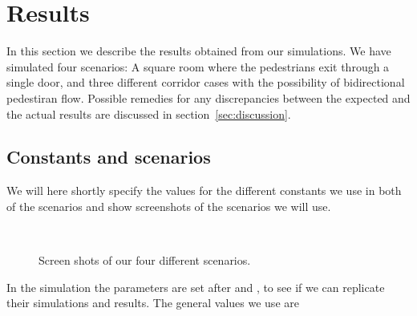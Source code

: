 \section{Results}
\label{sec:results}
In this section we describe the results obtained from our simulations. 
We have simulated four scenarios: A square room where the pedestrians 
exit through a single door, and three different corridor cases with  
the possibility of bidirectional pedestiran flow. Possible remedies 
for any discrepancies between the expected and the actual results are 
discussed in section~\ref{sec:discussion}.

\subsection{Constants and scenarios}
We will here shortly specify the values for the different constants 
we use in both of the scenarios and show screenshots of the scenarios 
we will use.

\begin{figure}[h]
\centering
{}
\subfloat[Bottleneck.]{\resizebox{7cm}{!}{}}\\
\subfloat[Corridor.]{\resizebox{7cm}{!}{}}
\caption{Screen shots of our four different scenarios.}
\label{fig:fourcases}
\end{figure}

In the simulation the parameters are set after \cite{ABconstant} and 
\cite{self-org}, to see if we can replicate their simulations and results. 
The general values we use are

